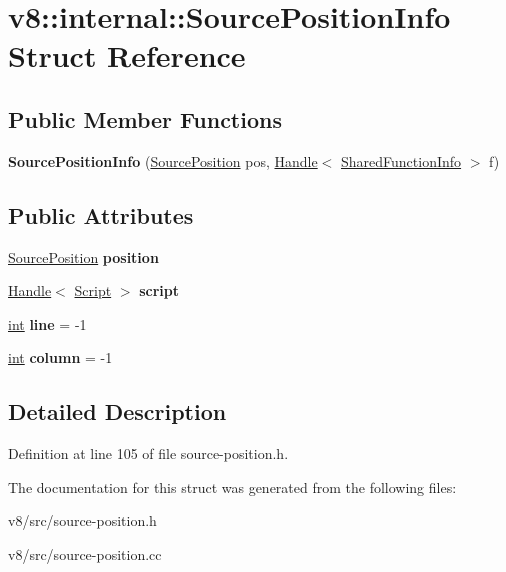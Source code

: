 \hypertarget{structv8_1_1internal_1_1SourcePositionInfo}{}\section{v8\+:\+:internal\+:\+:Source\+Position\+Info Struct Reference}
\label{structv8_1_1internal_1_1SourcePositionInfo}
\subsection*{Public Member Functions}
\begin{DoxyCompactItemize}
\item 
\mbox{\label{structv8_1_1internal_1_1SourcePositionInfo_a8459f6294fe790b416fde1b2f8fa2e9f}} 
{\bfseries Source\+Position\+Info} (\mbox{\hyperlink{classv8_1_1internal_1_1SourcePosition}{Source\+Position}} pos, \mbox{\hyperlink{classv8_1_1internal_1_1Handle}{Handle}}$<$ \mbox{\hyperlink{classv8_1_1internal_1_1SharedFunctionInfo}{Shared\+Function\+Info}} $>$ f)
\end{DoxyCompactItemize}
\subsection*{Public Attributes}
\begin{DoxyCompactItemize}
\item 
\mbox{\label{structv8_1_1internal_1_1SourcePositionInfo_a133bb8211a0460bc9a029de26a0fceb3}} 
\mbox{\hyperlink{classv8_1_1internal_1_1SourcePosition}{Source\+Position}} {\bfseries position}
\item 
\mbox{\label{structv8_1_1internal_1_1SourcePositionInfo_a9a1e88ae3f0951530e4bff3160599aac}} 
\mbox{\hyperlink{classv8_1_1internal_1_1Handle}{Handle}}$<$ \mbox{\hyperlink{classv8_1_1internal_1_1Script}{Script}} $>$ {\bfseries script}
\item 
\mbox{\label{structv8_1_1internal_1_1SourcePositionInfo_aa8df9f446e4194fbb7ba862b6da3cb48}} 
\mbox{\hyperlink{classint}{int}} {\bfseries line} = -\/1
\item 
\mbox{\label{structv8_1_1internal_1_1SourcePositionInfo_ab67c90230c1939348fa1f329ca7e9308}} 
\mbox{\hyperlink{classint}{int}} {\bfseries column} = -\/1
\end{DoxyCompactItemize}


\subsection{Detailed Description}


Definition at line 105 of file source-\/position.\+h.



The documentation for this struct was generated from the following files\+:\begin{DoxyCompactItemize}
\item 
v8/src/source-\/position.\+h\item 
v8/src/source-\/position.\+cc\end{DoxyCompactItemize}
